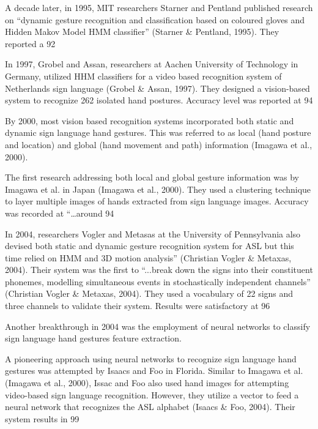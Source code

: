 A decade later, in 1995, MIT researchers Starner and Pentland published research on ``dynamic gesture recognition and classification based on coloured gloves and Hidden Makov Model HMM classifier'' (Starner \& Pentland, 1995). They reported a 92%

In 1997, Grobel and Assan, researchers at Aachen University of Technology in Germany, utilized HHM classifiers for a video based recognition system of Netherlands sign language (Grobel \& Assan, 1997). They designed a vision-based system to recognize 262 isolated hand postures. Accuracy level was reported at 94%

By 2000, most vision based recognition systems incorporated both static and dynamic sign language hand gestures. This was referred to as local (hand posture and location) and global (hand movement and path) information (Imagawa et al., 2000).

The first research addressing both local and global gesture information was by Imagawa et al. in Japan (Imagawa et al., 2000). They used a clustering technique to layer multiple images of hands extracted from sign language images. Accuracy was recorded at ``…around 94 %

In 2004, researchers Vogler and Metasas at the University of Pennsylvania also devised both static and dynamic gesture recognition system for ASL but this time relied on HMM and 3D motion analysis'' (Christian Vogler \& Metaxas, 2004). Their system was the first to ``...break down the signs into their constituent phonemes, modelling simultaneous events in stochastically independent channels'' (Christian Vogler \& Metaxas, 2004). They used a vocabulary of 22 signs and three channels to validate their system. Results were satisfactory at 96%

Another breakthrough in 2004 was the employment of neural networks to classify sign language hand gestures feature extraction. 

A pioneering approach using neural networks to recognize sign language hand gestures was attempted by Isaacs and Foo in Florida. Similar to Imagawa et al. (Imagawa et al., 2000), Issac and Foo also used hand images for attempting video-based sign language recognition. However, they utilize a vector to feed a neural network that recognizes the ASL alphabet (Isaacs \& Foo, 2004). Their system results in 99%

